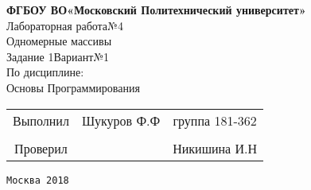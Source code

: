 \documentclass[a4paper]{article}
\begin{document}
\begin{center}
\hfill \break
\large{\textbf{ФГБОУ ВО«Московский Политехнический университет»}}\\
\hfill \break
\hfill \break
\hfill \break
\hfill \break
\hfill \break
\hfill \break
\hfill \break
\large{Лабораторная работа№4}\\
\footnotesize{Одномерные массивы\\
Задание 1\hspace{3cm}Вариант№1\break\\
По дисциплине:\\
Основы Программирования
}
\end{center}
\hfill \break
\hfill \break
\hfill \break
\hfill \break
\hfill \break
\hfill \break
\hfill \break
\hfill \break
\hfill \break
\hfill \break
\normalsize{ 
\begin{tabular}{ccc}
\hspace{4cm}Выполнил & Шукуров Ф.Ф  & группа 181-362\\
\\
\hspace{4cm}Проверил & \underline{\hspace{3cm}}& Никишина И.Н
\end{tabular}
}
\hfill \break
\hfill \break
\hfill \break
\hfill \break
\hfill \break
\hfill \break
\hfill \break
\hfill \break
\hfill \break
\hfill \break
\hfill \break
\hfill \break
\begin{center}\texttt{Москва 2018}\end{center}
\thispagestyle{empty}
\end{document}
